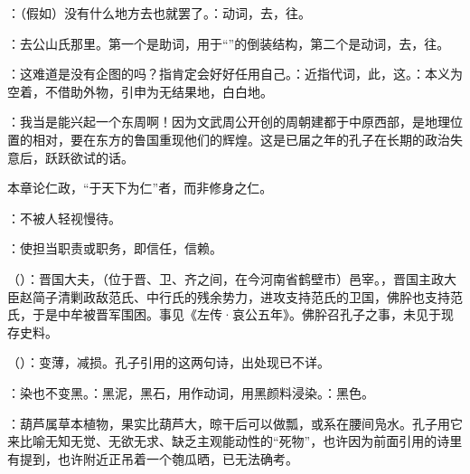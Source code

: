 {\item {}：（假如）没有什么地方去也就罢了。：动词，去，往。
\item {}：去公山氏那里。第一个是助词，用于“”的倒装结构，第二个是动词，去，往。
\item {}：这难道是没有企图的吗？指肯定会好好任用自己。：近指代词，此，这。：本义为空着，不借助外物，引申为无结果地，白白地。
\item {}：我当是能兴起一个东周啊！因为文武周公开创的周朝建都于中原西部，是地理位置的相对，要在东方的鲁国重现他们的辉煌。这是已届之年的孔子在长期的政治失意后，跃跃欲试的话。
}
{}


{
本章论仁政，“于天下为仁”者，而非修身之仁。%
\begin{lyblobitemize}
\item {}：不被人轻视慢待。
\item {}：使担当职责或职务，即信任，信赖。
\end{lyblobitemize}
}
{}


{
\item {}（）：晋国大夫，（位于晋、卫、齐之间，在今河南省鹤壁市）邑宰。，晋国主政大臣赵简子清剿政敌范氏、中行氏的残余势力，进攻支持范氏的卫国，佛肸也支持范氏，于是中牟被晋军围困。事见《左传·哀公五年》。佛肸召孔子之事，未见于现存史料。%
\item {}（）：变薄，减损。孔子引用的这两句诗，出处现已不详。

：染也不变黑。：黑泥，黑石，用作动词，用黑颜料浸染。：黑色。

\item {}：葫芦属草本植物，果实比葫芦大，晾干后可以做瓢，或系在腰间凫水。孔子用它来比喻无知无觉、无欲无求、缺乏主观能动性的“死物”，也许因为前面引用的诗里有提到，也许附近正吊着一个匏瓜晒，已无法确考。
}
{}



